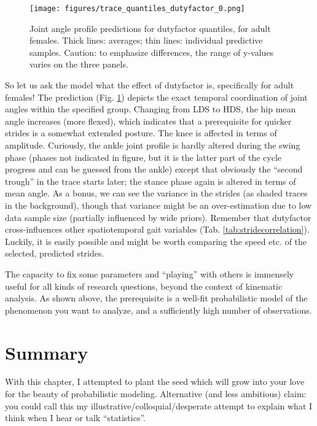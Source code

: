 \begin{figure}[p]
\centering
\texttt{[image: figures/trace\_quantiles\_dutyfactor\_0.png]}
\caption{\label{fig:dutyquantileprediction}Joint angle profile predictions for dutyfactor quantiles, for adult females. Thick lines: averages; thin lines: individual predictive samples. Caution: to emphasize differences, the range of y-values varies on the three panels.}
\end{figure}

So let us ask the model what the effect of dutyfactor is, specifically for adult females!
The prediction (Fig. \ref{fig:dutyquantileprediction}) depicts the exact temporal coordination of joint angles within the specified group.
Changing from LDS to HDS, the hip mean angle increases (more flexed), which indicates that a prerequisite for quicker strides is a somewhat extended posture.
The knee is affected in terms of amplitude.
Curiously, the ankle joint profile is hardly altered during the swing phase (phases not indicated in figure, but it is the latter part of the cycle progress and can be guessed from the ankle) except that obviously the ``second trough'' in the trace starts later; the stance phase again is altered in terms of mean  angle.
As a bonus, we can see the variance in the strides (as shaded traces in the background), though that variance might be an over-estimation due to low data sample size (partially influenced by wide priors).
Remember that dutyfactor cross-influences other spatiotemporal gait variables (Tab. \ref{tab:stridecorrelation}).
Luckily, it is easily possible and might be worth comparing the speed etc. of the selected, predicted strides.


The capacity to fix some parameters and ``playing'' with others is immensely useful for all kinds of research questions, beyond the context of kinematic analysis.
As shown above, the prerequisite is a well-fit probabilistic model of the phenomenon you want to analyze, and a sufficiently high number of observations.



\FloatBarrier
\clearpage
\section{Summary}
\label{sec:org527d8db}
With this chapter, I attempted to plant the seed which will grow into your love for the beauty of probabilistic modeling.
Alternative (and less ambitious) claim: you could call this my illustrative/colloquial/desperate attempt to explain what I think when I hear or talk ``statistics''.

